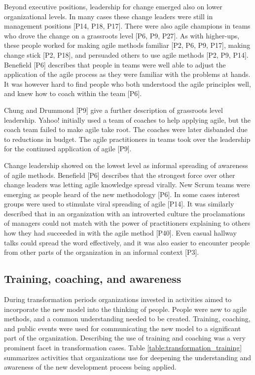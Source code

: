 
Beyond executive positions, leadership for change emerged also on lower
organizational levels. In many cases these change leaders were still in
management positions [P14, P18, P17]. There were also agile champions in teams
who drove the change on a grassroots level [P6, P9, P27].
As with higher-ups, these people worked for making agile methods familiar [P2,
P6, P9, P17], making change stick [P2, P18], and persuaded others to use agile
methods [P2, P9, P14].
Benefield [P6] describes that people in teams were well able to adjust the
application of the agile process as they were familiar with the problems at
hands. It was however hard to find people who both understood the agile
principles well, and knew how to coach within the team [P6].

Chung and Drummond [P9] give a further description of grassroots level
leadership. Yahoo! initially used a team of coaches to help applying agile, but
the coach team failed to make agile take root. The coaches were later disbanded
due to reductions in budget. The agile practitioners in teams took over the
leadership for the continued application of agile [P9].


Change leadership showed on the lowest level as informal spreading of awareness
of agile methods.
Benefield [P6] describes that the strongest force over other change leaders was
letting agile knowledge spread virally. New Scrum teams were emerging as people
heard of the new methodology [P6]. In some cases interest groups were used to
stimulate viral spreading of agile [P14].
It was similarly described that in an organization with an introverted culture
the proclamations of managers could not match with the power of practitioners
explaining to others how they had succeeded in with the agile method [P40].
Even casual hallway talks could spread the word effectively, and it was also
easier to encounter people from other parts of the organization in an informal
context [P3].


\subsection{Training, coaching, and awareness}

During transformation periods organizations invested in activities aimed to
incorporate the new model into the thinking of people. People were new to agile
methods, and a common understanding needed to be created. Training, coaching,
and public events were used for communicating the new model to a significant
part of the organization. Describing the use of training and coaching was a very
prominent facet in transformation cases.
Table \ref{table:transformation_training} summarizes activities that
organizations use for deepening the understanding and awareness of the new
development process being applied.

